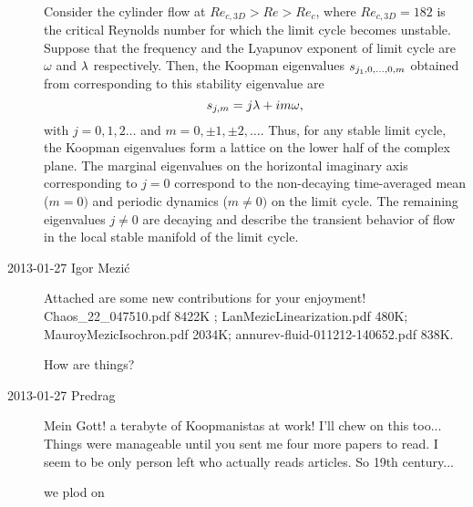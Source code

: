 \begin{description}
\\
%
Consider the cylinder flow at  $Re_{c,3D}>Re>Re_c$, where
$Re_{c,3D}=182$ is the critical Reynolds number for which the limit
cycle becomes unstable. Suppose that the frequency and the Lyapunov
exponent of limit cycle are $\omega$ and $\lambda$ respectively.
%
Then, the Koopman eigenvalues $s_{j_1,0,\dots,0,m}$ obtained
from   corresponding to this stability
eigenvalue are
%
\begin{equation}
\eigenvL_{j,m}  =  j \Lyap + im\omega, %
\label{eq:tracePeriod}
\end{equation}
%
with $j=0,1,2\dots$ and $m=0,\pm1,\pm 2,\dots$.
%
Thus, for any stable limit cycle, the Koopman eigenvalues form a
lattice on the lower half of the complex plane. The marginal
eigenvalues on the horizontal imaginary axis corresponding to $j=0$
correspond to the non-decaying time-averaged mean ($m=0)$ and
periodic dynamics ($m\neq 0)$ on the limit cycle.
The remaining
eigenvalues $j\neq 0$ are decaying and describe the transient
behavior of flow in the local stable manifold of the limit cycle.

\item[2013-01-27 Igor Mezi\'c]
    Attached are some new contributions for your enjoyment!
Chaos\_22\_047510.pdf
8422K ; LanMezicLinearization.pdf
480K; MauroyMezicIsochron.pdf
2034K; annurev-fluid-011212-140652.pdf 838K.

How are things?

\item[2013-01-27 Predrag]
Mein Gott!  a terabyte of Koopmanistas at work! I'll chew on this
too... Things were manageable until  you sent me four more papers to
read. I seem to be only person left who actually reads articles. So
19th century...

we plod on

\end{description}

\renewcommand{\vel}{F}      %
